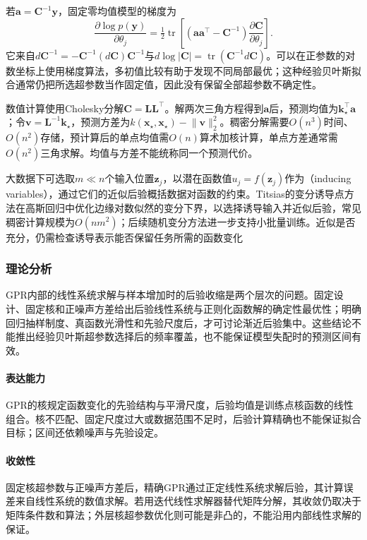 若$\bm{a}=\bm{C}^{-1}\bm{y}$，固定零均值模型的梯度为
\[
  \frac{\partial\log p(\bm{y})}{\partial\theta_j}
  =\tfrac12\operatorname{tr}\!\left[
    (\bm{a}\bm{a}^{\top}-\bm{C}^{-1})
    \frac{\partial\bm{C}}{\partial\theta_j}\right].
\]
它来自$d\bm{C}^{-1}=-\bm{C}^{-1}(d\bm{C})\bm{C}^{-1}$与$d\log|\bm{C}|=\operatorname{tr}(\bm{C}^{-1}d\bm{C})$。可以在正参数的对数坐标上使用梯度算法，多初值比较有助于发现不同局部最优；这种经验贝叶斯拟合通常仍把所选超参数当作固定值，因此没有保留全部超参数不确定性。

数值计算使用Cholesky分解$\bm{C}=\bm{L}\bm{L}^{\top}$。解两次三角方程得到$\bm{a}$后，预测均值为$\bm{k}_{\star}^{\top}\bm{a}$；令$\bm{v}=\bm{L}^{-1}\bm{k}_{\star}$，预测方差为$k(\bm{x}_{\star},\bm{x}_{\star})-\lVert\bm{v}\rVert_2^2$。稠密分解需要$O(n^3)$时间、$O(n^2)$存储，预计算后的单点均值需$O(n)$算术加核计算，单点方差通常需$O(n^2)$三角求解。均值与方差不能统称同一个预测代价。

大数据下可选取$m\ll n$个输入位置$\bm{z}_j$，以潜在函数值$u_j=f(\bm{z}_j)$作为（inducing variables），通过它们的近似后验概括数据对函数的约束。Titsias的变分诱导点方法在高斯回归中优化边缘对数似然的变分下界，以选择诱导输入并近似后验，常见稠密计算规模为$O(nm^2)$；后续随机变分方法进一步支持小批量训练。近似是否充分，仍需检查诱导表示能否保留任务所需的函数变化

\subsubsection{理论分析}
\label{sec:regression-gpr-theory}

GPR内部的线性系统求解与样本增加时的后验收缩是两个层次的问题。固定设计、固定核和正噪声方差给出后验线性系统与正则化函数解的确定性最优性；明确回归抽样制度、真函数光滑性和先验尺度后，才可讨论渐近后验集中。这些结论不能推出经验贝叶斯超参数选择后的频率覆盖，也不能保证模型失配时的预测区间有效。

\paragraph{表达能力}
GPR的核规定函数变化的先验结构与平滑尺度，后验均值是训练点核函数的线性组合。核不匹配、固定尺度过大或数据范围不足时，后验计算精确也不能保证拟合目标；区间还依赖噪声与先验设定。

\paragraph{收敛性}
固定核超参数与正噪声方差后，精确GPR通过正定线性系统求解后验，其计算误差来自线性系统的数值求解。若用迭代线性求解器替代矩阵分解，其收敛仍取决于矩阵条件数和算法；外层核超参数优化则可能是非凸的，不能沿用内部线性求解的保证。


